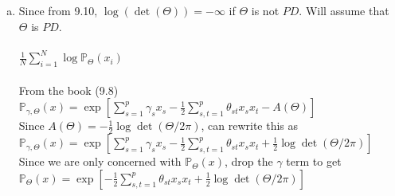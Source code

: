 \documentclass[11pt]{article}
\begin{document}
\begin{enumerate}[(a)]

\item
Since from 9.10, $\log(\det(\Theta)) = -\infty$ if $\Theta$ is not $PD$. Will assume that $\Theta$ is $PD$.\\
\\
$\frac{1}{N} \sum_{i=1}^N \log \mathbb{P}_\Theta (x_i)$\\
\\
From the book (9.8) $\mathbb{P}_{\gamma, \Theta}(x) = \exp[\sum_{s=1}^p \gamma_s x_s - \frac{1}{2} \sum_{s,t=1}^p \theta_{st} x_s x_t - A(\Theta)]$\\
Since $A(\Theta) = -\frac{1}{2} \log \det (\Theta/2\pi)$, can rewrite this as\\
$\mathbb{P}_{\gamma, \Theta}(x) = \exp[\sum_{s=1}^p \gamma_s x_s - \frac{1}{2} \sum_{s,t=1}^p \theta_{st} x_s x_t + \frac{1}{2} \log \det (\Theta / 2\pi)]$\\
Since we are only concerned with $\mathbb{P}_\Theta (x)$, drop the $\gamma$ term to get\\
$\mathbb{P}_{\Theta}(x) = \exp[- \frac{1}{2} \sum_{s,t=1}^p \theta_{st} x_s x_t + \frac{1}{2} \log \det (\Theta / 2\pi)]$\\


\end{enumerate}
\end{document}
